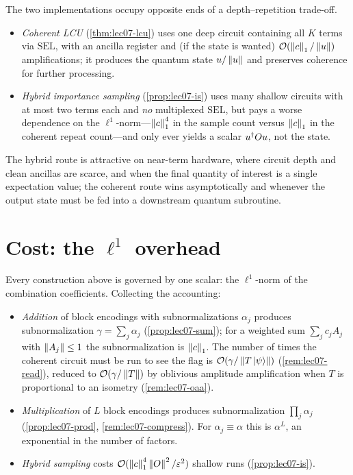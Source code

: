 \begin{remark}
\label{rem:lec07-tradeoff}
The two implementations occupy opposite ends of a depth--repetition trade-off.
\begin{itemize}[leftmargin=1.4em,nosep]
  \item \emph{Coherent LCU} (\cref{thm:lec07-lcu}) uses one deep circuit containing
        all $K$ terms via $\mathrm{SEL}$, with an ancilla register and (if the state
        is wanted) $\mathcal{O}(\left\lVert c \right\rVert_1/\left\lVert u \right\rVert)$ amplifications; it produces the
        quantum state $u/\left\lVert u \right\rVert$ and preserves coherence for further processing.
  \item \emph{Hybrid importance sampling} (\cref{prop:lec07-is}) uses many shallow
        circuits with at most two terms each and \emph{no} multiplexed $\mathrm{SEL}$,
        but pays a worse dependence on the $\ell^1$-norm---$\left\lVert c \right\rVert_1^4$ in the
        sample count versus $\left\lVert c \right\rVert_1$ in the coherent repeat count---and only ever
        yields a scalar $u^{\dagger} Ou$, not the state.
\end{itemize}
The hybrid route is attractive on near-term hardware, where circuit depth and clean
ancillas are scarce, and when the final quantity of interest is a single expectation
value; the coherent route wins asymptotically and whenever the output state must be
fed into a downstream quantum subroutine.
\end{remark}

\section{Cost: the \texorpdfstring{$\ell^1$}{l1} overhead}
\label{sec:lec07-5}

Every construction above is governed by one scalar: the $\ell^1$-norm of the
combination coefficients. Collecting the accounting:

\begin{itemize}[leftmargin=1.4em,nosep]
  \item \emph{Addition} of block encodings with subnormalizations $\alpha_j$ produces
        subnormalization $\gamma=\sum_j\alpha_j$ (\cref{prop:lec07-sum}); for a
        weighted sum $\sum_j c_j A_j$ with $\left\lVert A_j \right\rVert\le1$ the subnormalization is
        $\left\lVert c \right\rVert_1$. The number of times the coherent circuit must be run to see the
        flag is $\mathcal{O}(\gamma/\left\lVert T\ket{\psi} \right\rVert)$
        (\cref{rem:lec07-read}), reduced to $\mathcal{O}(\gamma/\left\lVert T \right\rVert)$ by oblivious
        amplitude amplification when $T$ is proportional to an isometry
        (\cref{rem:lec07-oaa}).
  \item \emph{Multiplication} of $L$ block encodings produces subnormalization
        $\prod_j\alpha_j$ (\cref{prop:lec07-prod}, \cref{rem:lec07-compress}). For
        $\alpha_j\equiv\alpha$ this is $\alpha^L$, an exponential in the number of
        factors.
  \item \emph{Hybrid sampling} costs $\mathcal{O}(\left\lVert c \right\rVert_1^4\left\lVert O \right\rVert^2/\varepsilon^2)$
        shallow runs (\cref{prop:lec07-is}).
\end{itemize}

